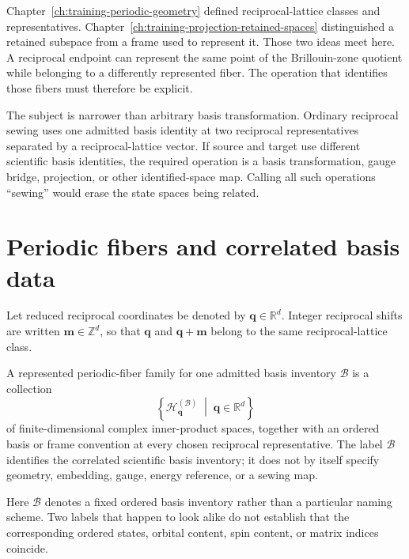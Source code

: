 Chapter~\ref{ch:training-periodic-geometry} defined reciprocal-lattice classes
and representatives. Chapter~\ref{ch:training-projection-retained-spaces}
distinguished a retained subspace from a frame used to represent it. Those two
ideas meet here. A reciprocal endpoint can represent the same point of the
Brillouin-zone quotient while belonging to a differently represented fiber.
The operation that identifies those fibers must therefore be explicit.

The subject is narrower than arbitrary basis transformation. Ordinary
reciprocal sewing uses one admitted basis identity at two reciprocal
representatives separated by a reciprocal-lattice vector. If source and target
use different scientific basis identities, the required operation is a basis
transformation, gauge bridge, projection, or other identified-space map. Calling
all such operations ``sewing'' would erase the state spaces being related.

\section{Periodic fibers and correlated basis data}

Let reduced reciprocal coordinates be denoted by
\(\mathbf q\in\mathbb R^d\). Integer reciprocal shifts are written
\(\mathbf m\in\mathbb Z^d\), so that \(\mathbf q\) and
\(\mathbf q+\mathbf m\) belong to the same reciprocal-lattice class.

\begin{definition}
\label{def:training-periodic-fiber-family}
A represented periodic-fiber family for one admitted basis inventory
\(\mathcal B\) is a collection
\begin{equation}
  \left\{\mathcal H_{\mathbf q}^{(\mathcal B)}
  \;\middle|\;\mathbf q\in\mathbb R^d\right\}
\end{equation}
of finite-dimensional complex inner-product spaces, together with an ordered
basis or frame convention at every chosen reciprocal representative. The label
\(\mathcal B\) identifies the correlated scientific basis inventory; it does
not by itself specify geometry, embedding, gauge, energy reference, or a sewing
map.
\end{definition}

Here \(\mathcal B\) denotes a fixed ordered basis inventory rather than a
particular naming scheme. Two labels that happen to look alike do not establish
that the corresponding ordered states, orbital content, spin content, or matrix
indices coincide.


